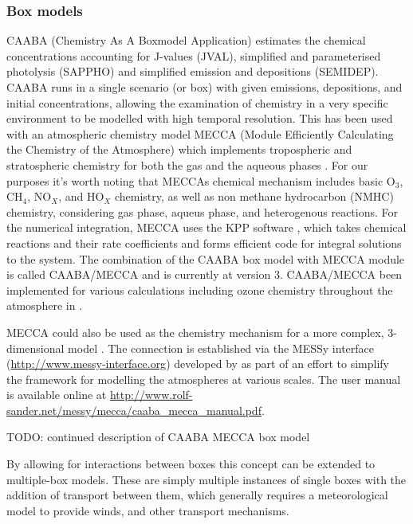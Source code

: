     \subsubsection{Box models} %
      
      CAABA (Chemistry As A Boxmodel Application) estimates the chemical concentrations accounting for J-values (JVAL), simplified and parameterised photolysis (SAPPHO) and simplified emission and depositions (SEMIDEP).
      CAABA runs in a single scenario (or box) with given emissions, depositions, and initial concentrations, allowing the examination of chemistry in a very specific environment to be modelled with high temporal resolution.
      This has been used with an atmospheric chemistry model MECCA (Module Efficiently Calculating the Chemistry of the Atmosphere) which implements tropospheric and stratospheric chemistry for both the gas and the aqueous phases \citep{Sander2005}.
      For our purposes it's worth noting that MECCAs chemical mechanism includes basic O$_3$, CH$_4$, NO$_X$, and HO$_X$ chemistry, as well as non methane hydrocarbon (NMHC) chemistry, considering gas phase, aqueus phase, and heterogenous reactions. \citep{Sander2005}
      For the numerical integration, MECCA uses the KPP software \citep{SanduSander2006}, which takes chemical reactions and their rate coefficients and forms efficient code for integral solutions to the system.
      The combination of the CAABA box model with MECCA module is called CAABA/MECCA and is currently at version 3.
      CAABA/MECCA been implemented for various calculations including ozone chemistry throughout the atmosphere in \cite{Zanis2014}.
  
      MECCA could also be used as the chemistry mechanism for a more complex, 3-dimensional model \citep[e.g.][]{Jockel2006}.
      The connection is established via the MESSy interface (\url{http://www.messy-interface.org}) developed by \cite{Jockel2005} as part of an effort to simplify the framework for modelling the atmospheres at various scales.
      The user manual is available online at \url{http://www.rolf-sander.net/messy/mecca/caaba_mecca_manual.pdf}.
  
      TODO: continued description of CAABA MECCA box model
    
      By allowing for interactions between boxes this concept can be extended to multiple-box models.
      These are simply multiple instances of single boxes with the addition of transport between them, which generally requires a meteorological model to provide winds, and other transport mechanisms.
      
